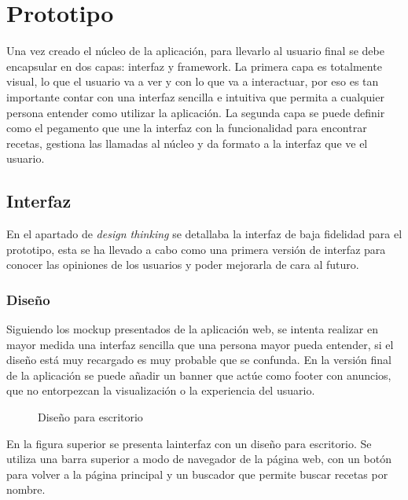 \chapter{Prototipo}
Una vez creado el núcleo de la aplicación, para llevarlo al usuario final se debe encapsular en dos capas: \Gls{interfaz} y \gls{framework}. La primera capa es totalmente visual, lo que el usuario va a ver y con lo que va a interactuar, por eso es tan importante contar con una \gls{interfaz} sencilla e intuitiva que permita a cualquier persona entender como utilizar la aplicación. La segunda capa se puede definir como el pegamento que une la \gls{interfaz} con la funcionalidad para encontrar recetas, gestiona las llamadas al núcleo y da formato a la \gls{interfaz} que ve el usuario.

\section{Interfaz}
En el apartado de \textit{design thinking} se detallaba la interfaz de baja fidelidad para el prototipo, esta se ha llevado a cabo como una primera versión de interfaz para conocer las opiniones de los usuarios y poder mejorarla de cara al futuro.
 
\subsection{Diseño}
Siguiendo los \gls{mockup} presentados de la aplicación web, se intenta realizar en mayor medida una \gls{interfaz} sencilla que una persona mayor pueda entender, si el diseño está muy recargado es muy probable que se confunda. En la versión final de la aplicación se puede añadir un banner que actúe como footer con anuncios, que no entorpezcan la visualización o la experiencia del usuario.

\begin{figure}[h!]
\centering
{}
\caption{Diseño para escritorio}
\label{fig:escritorio}
\end{figure}
En la figura superior se presenta la\gls{interfaz} con un diseño para escritorio. Se utiliza una barra superior a modo de navegador de la página web, con un botón para volver a la página principal y un buscador que permite buscar recetas por nombre. 

